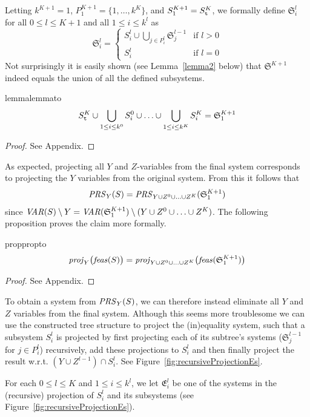 Letting $k^{K+1}=1$, $P^{K+1}_1 = \{1,\ldots, k^K\}$, and $S^{K+1}_1 = S^K_{\texttt{t}}$, we formally define $\mathfrak{S}^l_i$ for all $0 \leq l \leq K+1$ and all $1\leq i \leq k^l$ as
\[
\mathfrak{S}^l_i = \left\{\begin{array}{ll}
		S^l_i \cup\bigcup_{j\in P^l_i}\mathfrak{S}^{l-1}_j&\text{if }l>0\\
		S^l_i&\text{if } l=0
\end{array}\right.
\]
Not surprisingly it is easily shown (see Lemma~\ref{lemma2} below) that $\mathfrak{S}^{K+1}$ indeed equals the union of all the defined subsystems.
\begin{restatable}{lemma}{lemmato}\label{lemma2}
\[
S^K_{\texttt{t}}\cup\bigcup_{1\leq i\leq k^0}S^0_i\cup\ldots\cup\bigcup_{1\leq i\leq k^K} S^K_i = \mathfrak{S}^{K+1}_1
\]
\end{restatable}
\begin{proof}
See Appendix.
\end{proof}
%
\noindent As expected, projecting all $Y$ and $Z$-variables from the final system corresponds to projecting the $Y$ variables from the original system. From this it follows that 
\begin{equation}\label{eq:projYZ}
\mathit{PRS}_Y(S) = \mathit{PRS}_{Y\cup Z^0\cup \ldots \cup Z^K}(\mathfrak{S}^{K+1}_1)
\end{equation}
since $\mathit{VAR}(S)\setminus Y = \mathit{VAR}(\mathfrak{S}^{K+1}_1)\setminus(Y\cup Z^0\cup \ldots \cup Z^K)$. 
The following proposition proves the claim more formally.
\begin{restatable}{prop}{propto}\label{prop:2}
\[
\mathit{proj}_Y\big(\mathit{feas}(S)\big) = \mathit{proj}_{Y\cup Z^0\cup \ldots \cup Z^K}\big(\mathit{feas}(\mathfrak{S}^{K+1}_1)\big) 
\]
\end{restatable}
\begin{proof}
See Appendix.
\end{proof}
%
\noindent To obtain a system from $\mathit{PRS}_Y(S)$, we can therefore instead eliminate all $Y$ and $Z$ variables from the final system. Although this seems more troublesome we can use the constructed tree structure to project the (in)equality system, such that a subsystem $S^l_i$ is projected by first projecting each of its subtree's systems ($\mathfrak{S}^{l-1}_j$ for $j\in P^l_i$) recursively, add these projections to $S^l_i$ and then finally project the result w.r.t. $(Y\cup Z^{l-1})\cap S^l_i$. See Figure~\ref{fig:recursiveProjectionEs}.

For each $0\leq l\leq K$ and $1\leq i \leq k^l$, we let $\mathfrak{E}^l_i$ be one of the systems in the (recursive) projection of $S^l_i$ and its subsystems (see Figure~\ref{fig:recursiveProjectionEs}). 


